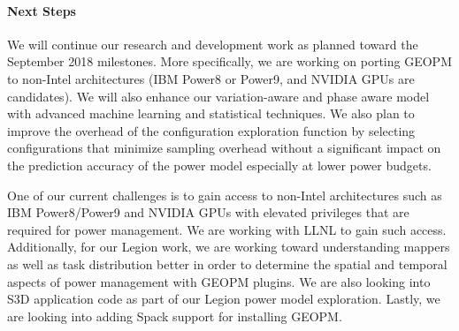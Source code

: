 \paragraph{Next Steps}
We will continue our research and development work as planned toward the September 2018 milestones. More specifically, we are working on porting GEOPM to non-Intel architectures (IBM Power8 or Power9, and NVIDIA GPUs are candidates). We will also enhance our variation-aware and phase aware model with advanced machine learning and statistical techniques. We also plan to improve the overhead of the configuration exploration function by selecting configurations that minimize sampling overhead without a significant impact on the prediction accuracy of the power model especially at lower power budgets. 

One of our current challenges is to gain access to non-Intel architectures such as IBM Power8/Power9 and NVIDIA GPUs with elevated privileges that are required for power management. We are working with LLNL to gain such access. Additionally, for our Legion work, we are working toward understanding mappers as well as task distribution better in order to determine the spatial and temporal aspects of power management with GEOPM plugins. We are also looking into S3D application code as part of our Legion power model  exploration. Lastly, we are looking into adding Spack support for installing GEOPM. 


